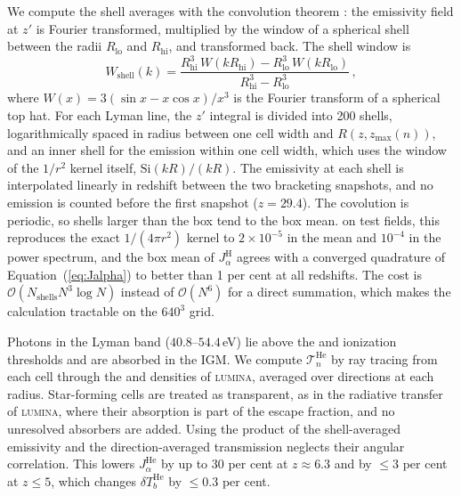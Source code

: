 \documentclass[apj,twocolumn, appendixfloats, twocolappendix, numberedappendix, tighten]{openjournal}
\DeclareRobustCommand{\lumina}{\mbox{\textsc{lumina}}\xspace}
\begin{document}
\begin{appendix}
We compute the shell averages with the convolution theorem \citep{Mesinger2011}: the emissivity field at $z'$ is Fourier transformed, multiplied by the window of a spherical shell between the radii $R_\mathrm{lo}$ and $R_\mathrm{hi}$, and transformed back. The shell window is
\begin{equation}
    W_\mathrm{shell}(k) = \frac{R_\mathrm{hi}^3\, W(kR_\mathrm{hi}) - R_\mathrm{lo}^3\, W(kR_\mathrm{lo})}{R_\mathrm{hi}^3 - R_\mathrm{lo}^3}\,,
    \label{eq:tophat}
\end{equation}
where $W(x) = 3(\sin x - x\cos x)/x^3$ is the Fourier transform of a spherical top hat. For each Lyman line, the $z'$ integral is divided into 200 shells, logarithmically spaced in radius between one cell width and $R(z, z_\mathrm{max}(n))$, and an inner shell for the emission within one cell width, which uses the window of the $1/r^2$ kernel itself, $\mathrm{Si}(kR)/(kR)$. The emissivity at each shell is interpolated linearly in redshift between the two bracketing snapshots, and no emission is counted before the first snapshot ($z=29.4$). The covolution is periodic, so shells larger than the box tend to the box mean. on test fields, this reproduces the exact $1/(4\pi r^2)$ kernel to $2\times10^{-5}$ in the mean and $10^{-4}$ in the power spectrum, and the box mean of $J_\alpha^{\mathrm{H}}$ agrees with a converged quadrature of Equation~(\ref{eq:Jalpha}) to better than 1 per cent at all redshifts. The cost is $\mathcal{O}(N_\mathrm{shells} N^3 \log N)$ instead of $\mathcal{O}(N^6)$ for a direct summation, which makes the calculation tractable on the $640^3$ grid.

Photons in the  Lyman band ($40.8$--$54.4$\,eV) lie above the  and  ionization thresholds and are absorbed in the IGM. We compute $\mathcal{T}^\mathrm{He}_n$ by ray tracing from each cell through the  and  densities of \lumina, averaged over directions at each radius. Star-forming cells are treated as transparent, as in the radiative transfer of \lumina, where their absorption is part of the escape fraction, and no unresolved absorbers are added. Using the product of the shell-averaged emissivity and the direction-averaged transmission neglects their angular correlation. This lowers $J_\alpha^\mathrm{He}$ by up to 30 per cent at $z \approx 6.3$ and by $\leq 3$ per cent at $z \leq 5$, which changes $\delta T_b^{\mathrm{He}}$ by $\leq 0.3$ per cent.

\end{appendix}
\end{document}
